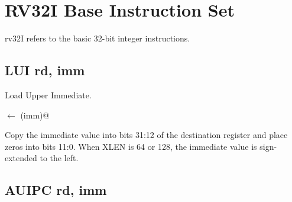 \section{RV32I Base Instruction Set}

%
\Gls{rv32}I refers to the basic 32-bit integer instructions.

\subsection{LUI rd, imm}

Load Upper Immediate.

\verb@rd@ $\leftarrow$ \verb@zr(imm)@

Copy the immediate value into bits 31:12 of the destination register and
place zeros into bits 11:0.
When XLEN is 64 or 128, the immediate value is sign-extended to the left.




%
%
%
%


\subsection{AUIPC rd, imm}

